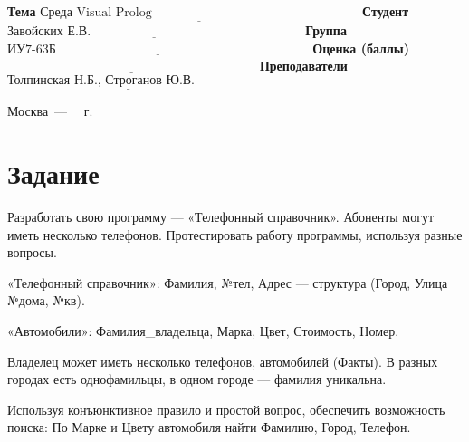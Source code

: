 \documentclass[12pt]{report}
\begin{document}
\begin{titlepage}
		\noindent\textbf{Тема} $\underline{\text{Среда Visual Prolog~~~~~~~~~~~~~~~~~~~~~~~~~~~~~~~~~~~~~~~~~~~~~~~~~}}$\newline\newline
		\noindent\textbf{Студент} $\underline{\text{Завойских Е.В.~~~~~~~~~~~~~~~~~~~~~~~~~~~~~~~~~~~~~~~~~~~~~~~~~~}}$\newline\newline
		\noindent\textbf{Группа} $\underline{\text{ИУ7-63Б~~~~~~~~~~~~~~~~~~~~~~~~~~~~~~~~~~~~~~~~~~~~~~~~~~~~~~~~~~~~}}$\newline\newline
		\noindent\textbf{Оценка (баллы)} $\underline{\text{~~~~~~~~~~~~~~~~~~~~~~~~~~~~~~~~~~~~~~~~~~~~~~~~~~~~~~~~~~~}}$\newline\newline
		\noindent\textbf{Преподаватели} $\underline{\text{Толпинская Н.Б., Строганов Ю.В.~~~~~~~~~~~~~}}$\newline\newline\newline
		
		\begin{center}
			\vfill
			Москва~---~\the\year
			~г.
		\end{center}
	\end{titlepage}
		

\section{Задание}

Разработать свою программу --- «Телефонный справочник». Абоненты могут иметь
несколько телефонов. Протестировать работу программы, используя разные вопросы.

«Телефонный справочник»: Фамилия, №тел, Адрес --- структура (Город, Улица №дома, №кв).

«Автомобили»: Фамилия\_владельца, Марка, Цвет, Стоимость, Номер.

Владелец может иметь несколько телефонов, автомобилей (Факты). В разных городах
есть однофамильцы, в одном городе --- фамилия уникальна.

Используя конъюнктивное правило и простой вопрос, обеспечить возможность
поиска: По Марке и Цвету автомобиля найти Фамилию, Город, Телефон.
\end{document}
